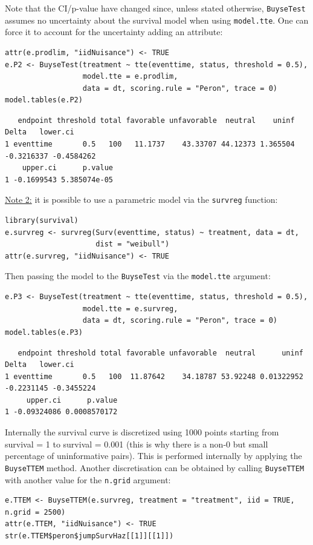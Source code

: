 \documentclass[12pt]{article}
\begin{document}
Note that the CI/p-value have changed since, unless stated otherwise,
\texttt{BuyseTest} assumes no uncertainty about the survival model when using
\texttt{model.tte}. One can force it to account for the uncertainty adding an attribute:
\lstset{language=r,label= ,caption= ,captionpos=b,numbers=none}
\begin{lstlisting}
attr(e.prodlim, "iidNuisance") <- TRUE
e.P2 <- BuyseTest(treatment ~ tte(eventtime, status, threshold = 0.5),
                  model.tte = e.prodlim,
                  data = dt, scoring.rule = "Peron", trace = 0)
model.tables(e.P2)
\end{lstlisting}

\begin{verbatim}
   endpoint threshold total favorable unfavorable  neutral    uninf      Delta   lower.ci
1 eventtime       0.5   100   11.1737    43.33707 44.12373 1.365504 -0.3216337 -0.4584262
    upper.ci      p.value
1 -0.1699543 5.385074e-05
\end{verbatim}


\bigskip

\uline{Note 2:} it is possible to use a parametric model via the \texttt{survreg} function:
\lstset{language=r,label= ,caption= ,captionpos=b,numbers=none}
\begin{lstlisting}
library(survival)
e.survreg <- survreg(Surv(eventtime, status) ~ treatment, data = dt, 
                     dist = "weibull")
attr(e.survreg, "iidNuisance") <- TRUE
\end{lstlisting}

Then passing the model to the \texttt{BuyseTest} via the \texttt{model.tte} argument:
\lstset{language=r,label= ,caption= ,captionpos=b,numbers=none}
\begin{lstlisting}
e.P3 <- BuyseTest(treatment ~ tte(eventtime, status, threshold = 0.5),
                  model.tte = e.survreg,
                  data = dt, scoring.rule = "Peron", trace = 0)
model.tables(e.P3)
\end{lstlisting}
\begin{verbatim}
   endpoint threshold total favorable unfavorable  neutral      uninf      Delta   lower.ci
1 eventtime       0.5   100  11.87642    34.18787 53.92248 0.01322952 -0.2231145 -0.3455224
     upper.ci      p.value
1 -0.09324086 0.0008570172
\end{verbatim}


Internally the survival curve is discretized using 1000 points
starting from survival = 1 to survival = 0.001 (this is why there is a
non-0 but small percentage of uninformative pairs). This is performed
internally by applying the \texttt{BuyseTTEM} method. Another discretisation
can be obtained by calling \texttt{BuyseTTEM} with another value for the \texttt{n.grid} argument:
\lstset{language=r,label= ,caption= ,captionpos=b,numbers=none}
\begin{lstlisting}
e.TTEM <- BuyseTTEM(e.survreg, treatment = "treatment", iid = TRUE, n.grid = 2500)
attr(e.TTEM, "iidNuisance") <- TRUE
str(e.TTEM$peron$jumpSurvHaz[[1]][[1]])
\end{lstlisting}
\end{document}
